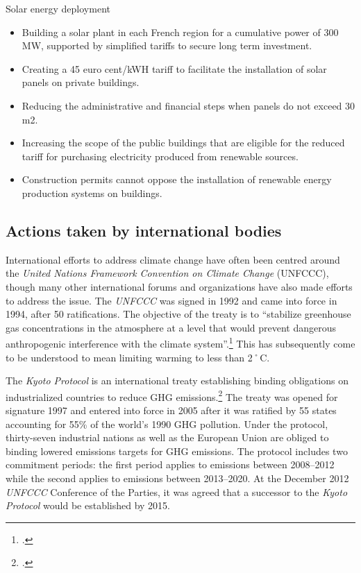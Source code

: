 Solar energy deployment
\begin{itemize}
	\item Building a solar plant in each French region for a cumulative power of 300 MW, supported by simplified tariffs to secure long term investment.
	\item Creating a 45 euro cent/kWH tariff to facilitate the installation of solar panels on private buildings.
	\item Reducing the administrative and financial steps when panels do not exceed 30 m2.
	\item Increasing the scope of the public buildings that are eligible for the reduced tariff for purchasing electricity produced from renewable sources.
	\item Construction permits cannot oppose the installation of renewable energy production systems on buildings.
\end{itemize}






		\subsection{Actions taken by international bodies}
		
		
		



International efforts to address climate change have often been centred around the \emph{United Nations Framework Convention on Climate Change} (UNFCCC), though many other international forums and organizations have also made efforts to address the issue. 
The \emph{UNFCCC} was signed in 1992 and came into force in 1994, after 50 ratifications.
The objective of the treaty is to ``stabilize greenhouse gas concentrations in the atmosphere at a level that would prevent dangerous anthropogenic interference with the climate system''.\footcite[][Artice 2: "Objective"]{UNFCCC}
This has subsequently come to be understood to mean limiting warming to less than 2˚C.



The \emph{Kyoto Protocol} is an international treaty establishing binding obligations on industrialized countries to reduce GHG emissions.\footcite[][]{KyotoProtocol}
The treaty was opened for signature 1997 and entered into force in 2005 after it was ratified by 55 states accounting for 55\% of the world's 1990 GHG pollution.
Under the protocol, thirty-seven industrial nations as well as the European Union are obliged to binding lowered emissions targets for GHG emissions.
The protocol includes two commitment periods: the first period applies to emissions between 2008--2012 while the second  applies to emissions between 2013--2020. 
At the December 2012 \emph{UNFCCC} Conference of the Parties, it was agreed that a successor to the \emph{Kyoto Protocol} would be established by 2015.

